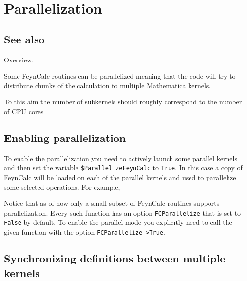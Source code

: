 \documentclass[../FeynCalcManual.tex]{subfiles}
\begin{document}
\hypertarget{parallelization}{
\section{Parallelization}\label{parallelization}}

\subsection{See also}

\hyperlink{toc}{Overview}.

Some FeynCalc routines can be parallelized meaning that the code will
try to distribute chunks of the calculation to multiple Mathematica
kernels.

To this aim the number of subkernels should roughly correspond to the
number of CPU cores

\subsection{Enabling parallelization}\label{enabling-parallelization}

To enable the parallelization you need to actively launch some parallel
kernels and then set the variable \texttt{\$ParallelizeFeynCalc} to
\texttt{True}. In this case a copy of FeynCalc will be loaded on each of
the parallel kernels and used to parallelize some selected operations.
For example,

\begin{Shaded}
\begin{Highlighting}[]
\OperatorTok{[}\OperatorTok{]}
\ExtensionTok{=} 
\end{Highlighting}
\end{Shaded}

Notice that as of now only a small subset of FeynCalc routines supports
parallelization. Every such function has an option
\texttt{FCParallelize} that is set to \texttt{False} by default. To
enable the parallel mode you explicitly need to call the given function
with the option \texttt{FCParallelize->True}.

\subsection{Synchronizing definitions between multiple
kernels}\label{synchronizing-definitions-between-multiple-kernels}
\end{document}
